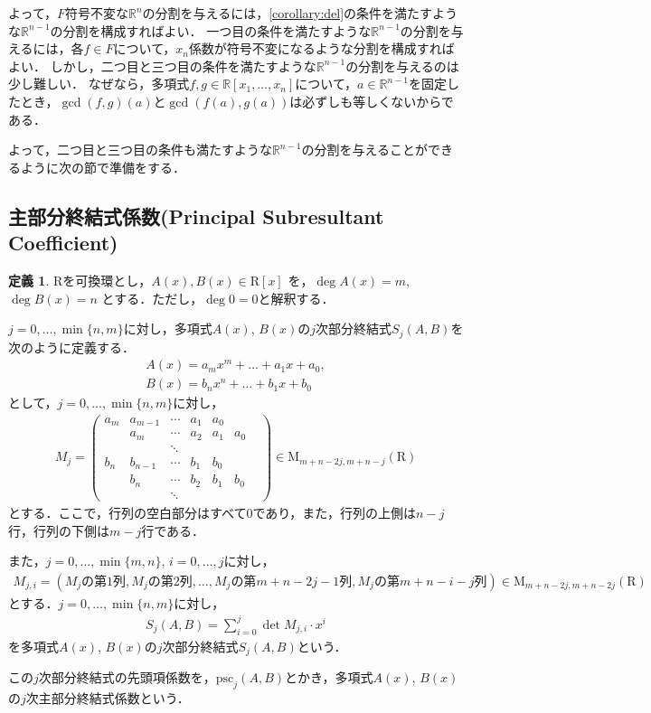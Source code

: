 \documentclass[uplatex, dvipdfmx]{jsarticle}
\newcommand{\R}{\mathbb{R}}
\newcommand{\psc}{\mathrm{psc}}
\theoremstyle{definition}
\newtheorem{definition}{定義}[section]
\begin{document}
よって，$F$符号不変な$\R^n$の分割を与えるには，\cref{corollary:del}の条件を満たすような$\R^{n-1}$の分割を構成すればよい．
一つ目の条件を満たすような$\R^{n-1}$の分割を与えるには，各$f \in F$について，$x_n$係数が符号不変になるような分割を構成すればよい．
しかし，二つ目と三つ目の条件を満たすような$\R^{n-1}$の分割を与えるのは少し難しい．
なぜなら，多項式$f, g \in \R[x_1, \dots, x_n]$について，$a \in \R^{n-1}$を固定したとき，$\gcd(f,g)(a)$と$\gcd(f(a),g(a))$は必ずしも等しくないからである．

よって，二つ目と三つ目の条件も満たすような$\R^{n-1}$の分割を与えることができるように次の節で準備をする．



\subsection{主部分終結式係数(Principal Subresultant Coefficient)}

\begin{definition}
$\mathrm{R}$を可換環とし，$A(x), B(x) \in \mathrm{R}[x]$ を，$\deg A(x) = m$, $\deg B(x) = n$ とする．ただし，$\deg 0 = 0$と解釈する．

$j = 0, \dots, \min\{n, m\}$に対し，多項式$A(x)$, $B(x)$の$j$次部分終結式$S_j(A, B)$を次のように定義する．
\begin{align*}
A(x) = a_m x^m + \dots + a_1 x + a_0, \\
B(x) = b_n x^n + \dots + b_1 x + b_0 
\end{align*}
として，$j = 0, \dots, \min\{n,m\}$に対し，
\begin{align*}
M_j = 
\begin{pmatrix}
a_m & a_{m-1} & \cdots & a_1 & a_0 &    &  \\
     &  a_m     & \cdots & a_2 & a_1& a_0 &  \\
     &   & \ddots &  & & \\
b_n & b_{n-1} & \cdots & b_1 & b_0 &    & \\
     &  b_n     & \cdots & b_2 & b_1& b_0 & \\
     &   & \ddots &  & & 
\end{pmatrix}
\in \mathrm{M}_{m+n-2j, m+n-j}(\mathrm{R})
\end{align*}
とする．ここで，行列の空白部分はすべて$0$であり，また，行列の上側は$n-j$行，行列の下側は$m-j$行である．

また，$j = 0, \dots, \min\{m,n\}$, $i = 0, \dots, j$に対し，
\begin{align*}
M_{j,i} = (\text{$M_j$の第$1$列}, \text{$M_j$の第$2$列}, \dots ,\text{$M_j$の第$m+n-2j-1$列}, \text{$M_j$の第$m+n-i-j$列})
\in \mathrm{M}_{m+n-2j, m+n-2j}(\mathrm{R})
\end{align*}
とする．$j = 0, \dots, \min\{n, m\}$に対し，
\begin{align*}
S_j(A, B) = \sum_{i=0}^j \det M_{j, i} \cdot x^i 
\end{align*}
を多項式$A(x)$, $B(x)$の$j$次部分終結式$S_j(A, B)$という．

この$j$次部分終結式の先頭項係数を，$\psc_j(A,B)$とかき，多項式$A(x)$, $B(x)$の$j$次主部分終結式係数という．
\end{definition}
\end{document}
